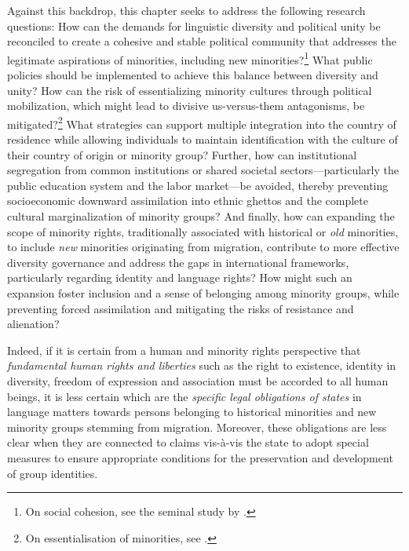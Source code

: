 \documentclass[output=paper,colorlinks,citecolor=brown]{langscibook}
\begin{document}
Against this backdrop, this chapter seeks to address the following research questions: How can the demands for linguistic diversity and political unity be reconciled to create a cohesive and stable political community that addresses the legitimate aspirations of minorities, including new minorities?\footnote{On social cohesion, see the seminal study by \citet{putnam2001,stolle_soroka_johnston2008,kelser_kraaykamp2010,portes_vickstrom2011}.} What public policies should be implemented to achieve this balance between diversity and unity? How can the risk of essentializing minority cultures through political mobilization, which might lead to divisive us-versus-them antagonisms, be mitigated?\footnote{On essentialisation of minorities, see \citet{marko_medda-windischer2018,vertovec_wessendorf2005}.} What strategies can support multiple integration into the country of residence while allowing individuals to maintain identification with the culture of their country of origin or minority group? Further, how can institutional segregation from common institutions or shared societal sectors—particularly the public education system and the labor market—be avoided, thereby preventing socioeconomic downward assimilation into ethnic ghettos and the complete cultural marginalization of minority groups? And finally, how can expanding the scope of minority rights, traditionally associated with historical or \textit{old} minorities, to include \textit{new} minorities originating from migration, contribute to more effective diversity governance and address the gaps in international frameworks, particularly regarding identity and language rights? How might such an expansion foster inclusion and a sense of belonging among minority groups, while preventing forced assimilation and mitigating the risks of resistance and alienation?

Indeed, if it is certain from a human and minority rights perspective that \textit{fundamental human rights and liberties} such as the right to existence, identity in diversity, freedom of expression and association must be accorded to all human beings, it is less certain which are the \textit{specific legal obligations of states} in language matters towards persons belonging to historical minorities and new minority groups stemming from migration. Moreover, these obligations are less clear when they are connected to claims vis-à-vis the state to adopt special measures to ensure appropriate conditions for the preservation and development of group identities. 
\end{document}

